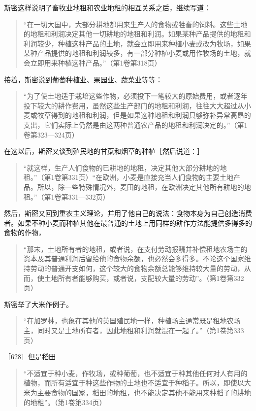 斯密这样说明了畜牧业地租和农业地租的相互关系之后，继续写道：

\begin{quote}{“在一切大国中，大部分耕地都用来生产人的食物或牲畜的饲料。这些土地的地租和利润决定其他一切耕地的地租和利润。如果某种产品提供的地租和利润较少，种植这种产品的土地，就会立即用来种植小麦或改为牧场，如果某种产品提供的地租和利润较多，有一部分种植小麦或用作牧场的土地，就会立即用来种植这种产品。”（第1卷第318页）}\end{quote}

接着，斯密说到葡萄种植业、果园业、蔬菜业等等：

\begin{quote}{“为了使土地适于栽培这些作物，必须投下一笔较大的原始费用，或者逐年投下较大的耕作费用，虽然这些生产部门的地租和利润，往往大大超过从小麦或牧草得到的地租和利润，但是如果这种地租和利润只够弥补异常高昂的支出，它们实际上仍然是由这两种普通农产品的地租和利润决定的。”（第1卷第323—324页）}\end{quote}

在这以后，斯密又谈到殖民地的甘蔗和烟草的种植［然后说道：］

\begin{quote}{“就这样，生产人们食物的已耕地的地租，决定其他大部分耕地的地租。”（第1卷第331页）“在欧洲，小麦是直接充当人们食物的主要土地产品。所以，除一些特殊情况外，麦田的地租，在欧洲决定其他所有耕地的地租。”（第1卷第331—332页）}\end{quote}

然后，斯密又回到重农主义理论，并用了他自己的说法：食物本身为自己创造消费者。如果不种小麦而种植其他在最普通的土地上用同样的耕作方法能提供多得多的食物的作物，

\begin{quote}{“那末，土地所有者的地租，或者说，在支付劳动报酬并补偿租地农场主的资本及其普通利润后留给他的食物余额，也必然会多得多。不论这个国家维持劳动的普通开支如何，这个较大的食物余额总能够维持较大量的劳动，从而，使土地所有者能够购买，或者说，支配较大量的劳动”。（第1卷第332页）}\end{quote}

斯密举了大米作例子。

\begin{quote}{“在加罗林，也象在其他的英国殖民地一样，种植场主通常既是租地农场主，同时又是土地所有者，因此地租和利润就混在一起了。”（第1卷第333页）}\end{quote}

［628］但是稻田

\begin{quote}{“不适宜于种小麦，作牧场，或种葡萄，也不适宜于种其他任何对人有用的植物，而所有适宜于种这些作物的土地也不适宜于种稻子。所以，即使以大米为主要食物的国家，稻田的地租，也不能决定其他不能用来种稻子的耕地的地租”。（第1卷第334页）}\end{quote}

